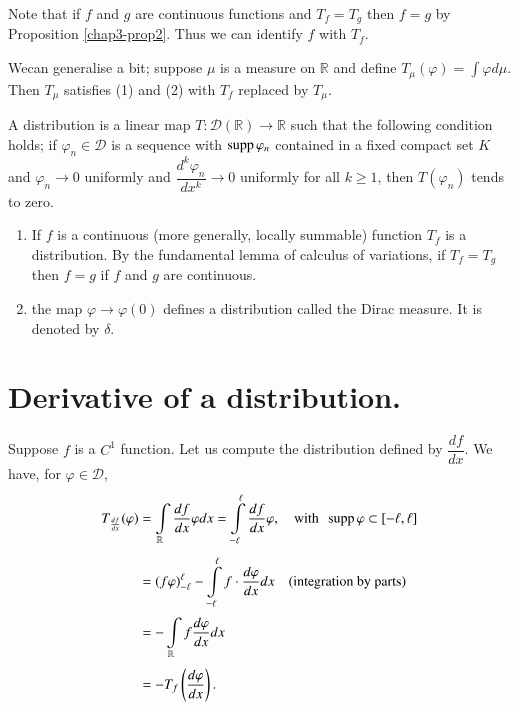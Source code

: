 Note that if $f$ and $g$ are continuous functions and $T_{f}=T_{g}$ then $f=g$ by Proposition \ref{chap3-prop2}. Thus we can identify $f$ with $T_{f}$.

We\pageoriginale can generalise a bit; suppose $\mu$ is a measure on $\mathbb{R}$ and define $T_{\mu}(\varphi)=\int \varphi d\mu$. Then $T_{\mu}$ satisfies (1) and (2) with $T_{f}$ replaced by $T_{\mu}$.

\begin{defi*}
A distribution is a linear map $T:\mathcal{D}(\mathbb{R})\to \mathbb{R}$ such that the following condition holds; if $\varphi_{n}\in \mathcal{D}$ is a sequence with $\operatorname{supp} \varphi_{n}$ contained in a fixed compact set $K$ and $\varphi_{n}\to 0$ uniformly and $\dfrac{d^{k}\varphi_{n}}{dx^{k}}\to 0$ uniformly for all $k\geq 1$, then $T(\varphi_{n})$ tends to zero.
\end{defi*}

\begin{examples*}
\begin{enumerate}
\renewcommand{\labelenumi}{(\theenumi)}
\item If $f$ is a continuous (more generally, locally summable) function $T_{f}$ is a distribution. By the fundamental lemma of calculus of variations, if $T_{f}=T_{g}$ then $f=g$ if $f$ and $g$ are continuous.

\item the map $\varphi\to \varphi(0)$ defines a distribution called the Dirac measure. It is denoted by $\delta$.
\end{enumerate}
\end{examples*}

\section*{Derivative of a distribution.}

Suppose $f$ is a $C^{1}$ function. Let us compute the distribution defined by $\dfrac{df}{dx}$. We have, for $\varphi\in \mathcal{D}$,
\begin{align*}
T_{\frac{df}{dx}}(\varphi) &= \int\limits_{\mathbb{R}}\frac{df}{dx}\varphi dx =\int\limits^{\ell}_{-\ell}\frac{df}{dx}\varphi,\quad\text{with~ } \operatorname{supp} \varphi\subset [-\ell,\ell]\\[4pt]
&= (f\varphi)^{\ell}_{-\ell}-\int\limits^{\ell}_{-\ell}f\cdot \frac{d\varphi}{dx}dx\quad\text{(integration by parts)}\\[3pt]
&= -\int\limits_{\mathbb{R}}f\frac{d\varphi}{dx}dx\\[3pt]
&= -T_{f}\left(\frac{d\varphi}{dx}\right).
\end{align*}


